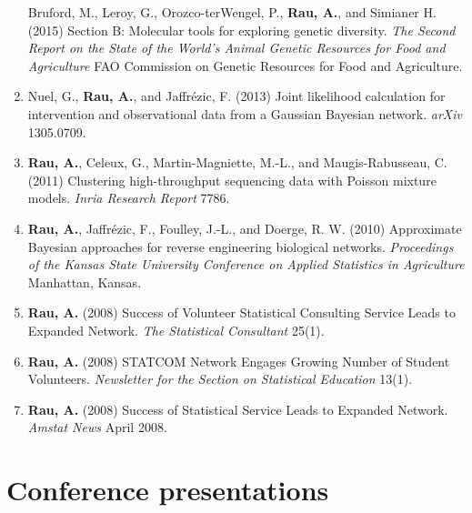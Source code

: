 \documentclass[11pt, a4paper]{awesome-cv}
\begin{document}
\begin{enumerate}
  Bruford, M., Leroy, G., Orozco-terWengel, P., \textbf{Rau, A.}, and
  Simianer H. (2015) Section B: Molecular tools for exploring genetic
  diversity. \emph{The Second Report on the State of the World's Animal
  Genetic Resources for Food and Agriculture} FAO Commission on Genetic
  Resources for Food and Agriculture.
\item
  Nuel, G., \textbf{Rau, A.}, and Jaffrézic, F. (2013) Joint likelihood
  calculation for intervention and observational data from a Gaussian
  Bayesian network. \emph{arXiv} 1305.0709.
\item
  \textbf{Rau, A.}, Celeux, G., Martin-Magniette, M.-L., and
  Maugis-Rabusseau, C. (2011) Clustering high-throughput sequencing data
  with Poisson mixture models. \emph{Inria Research Report} 7786.
\item
  \textbf{Rau, A.}, Jaffrézic, F., Foulley, J.-L., and Doerge, R. W.
  (2010) Approximate Bayesian approaches for reverse engineering
  biological networks. \emph{Proceedings of the Kansas State University
  Conference on Applied Statistics in Agriculture} Manhattan, Kansas.
\item
  \textbf{Rau, A.} (2008) Success of Volunteer Statistical Consulting
  Service Leads to Expanded Network. \emph{The Statistical Consultant}
  25(1).
\item
  \textbf{Rau, A.} (2008) STATCOM Network Engages Growing Number of
  Student Volunteers. \emph{Newsletter for the Section on Statistical
  Education} 13(1).
\item
  \textbf{Rau, A.} (2008) Success of Statistical Service Leads to
  Expanded Network. \emph{Amstat News} April 2008.
\end{enumerate}

\hypertarget{conference-presentations}{%
\section{Conference presentations}\label{conference-presentations}}
\end{document}
